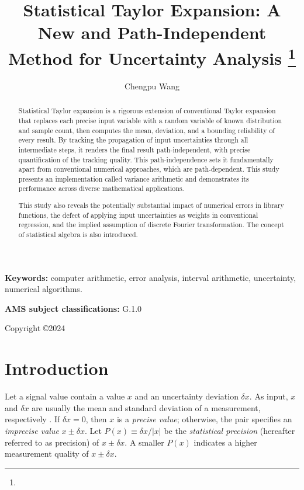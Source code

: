 \documentclass[twoside]{article}
\title{Statistical Taylor Expansion: A New and Path-Independent Method for Uncertainty Analysis \footnote{\whenaccepted}}
\author{Chengpu Wang
\institution{40 Grossman Street, Melville, NY 11747, USA}
\email{Chengpu@gmail.com}}
\numberwithin{equation}{section}
\newcommand{\keywords}[1]{\small\textbf{Keywords: }#1}
\newcommand{\AMSsubj}[1]{\noindent\textbf{AMS subject classifications: }#1}
\begin{document}
\maketitle
\begin{abstract}

Statistical Taylor expansion is a rigorous extension of conventional Taylor expansion that replaces each precise input variable with a random variable of known distribution and sample count, then computes the mean, deviation, and a bounding reliability of every result.
By tracking the propagation of input uncertainties through all intermediate steps, it renders the final result path-independent, with precise quantification of the tracking quality.
This path-independence sets it fundamentally apart from conventional numerical approaches, which are path-dependent.
This study presents an implementation called variance arithmetic and demonstrates its performance across diverse mathematical applications.

This study also reveals the potentially substantial impact of numerical errors in library functions, the defect of applying input uncertainties as weights in conventional regression, and the implied assumption of discrete Fourier transformation.
The concept of statistical algebra is also introduced.
\end{abstract}

\keywords{computer arithmetic, error analysis, interval arithmetic, uncertainty, numerical algorithms.}

\AMSsubj{G.1.0}

Copyright \copyright{2024}


\section{Introduction}
\label{sec: introduction}

Let a signal value contain a value $x$ and an uncertainty deviation $\delta x$.
As input, $x$ and $\delta x$ are usually the mean and standard deviation of a measurement, respectively \cite{Statistical_Methods, Precisions_Physical_Measurements}.
If $\delta x = 0$, then $x$ is a \emph{precise value}; otherwise, the pair specifies an \emph{imprecise value} $x \pm \delta x$.
Let $P(x) \equiv \delta x / |x|$ be the \emph{statistical precision} (hereafter referred to as precision) of $x \pm \delta x$.
A smaller $P(x)$ indicates a higher measurement quality of $x \pm \delta x$.
\end{document}

